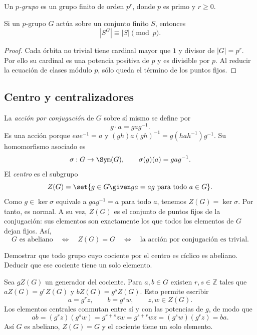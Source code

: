 \begin{defi}
Un \emph{$p$-grupo} es un grupo finito de orden $p^r$, donde $p$ es primo y $r\ge0$.
\end{defi}
\begin{coro}\label{coro:C6-fijos}
Si un $p$-grupo $G$ actúa sobre un conjunto finito $S$, entonces
\[
|S^G|\equiv|S|\pmod p.
\]
\end{coro}
\begin{proof}
Cada órbita no trivial tiene cardinal mayor que $1$ y divisor de $|G|=p^r$. Por ello su cardinal es una potencia positiva de $p$ y es divisible por $p$. Al reducir la ecuación de clases módulo $p$, sólo queda el término de los puntos fijos.
\end{proof}

\subsection{Centro y centralizadores}
La \emph{acción por conjugación} de $G$ sobre sí mismo se define por
\[
g\cdot a=gag^{-1}.
\]
Es una acción porque $eae^{-1}=a$ y $(gh)a(gh)^{-1}=g(hah^{-1})g^{-1}$. Su homomorfismo asociado es
\[
\sigma:G\to\Sym(G),\qquad \sigma(g)(a)=gag^{-1}.
\]
El \emph{centro} es el subgrupo
\[
Z(G)=\set{g\in G\given ga=ag\text{ para todo }a\in G}.
\]
Como $g\in\ker\sigma$ equivale a $gag^{-1}=a$ para todo $a$, tenemos $Z(G)=\ker\sigma$. Por tanto, es normal. A su vez, $Z(G)$ es el conjunto de puntos fijos de la conjugación: sus elementos son exactamente los que todos los elementos de $G$ dejan fijos. Así,
\[
G\text{ es abeliano}\quad\Longleftrightarrow\quad Z(G)=G
\quad\Longleftrightarrow\quad\text{la acción por conjugación es trivial}.
\]

\begin{ejer}\label{ejer:C6-centro}
Demostrar que todo grupo cuyo cociente por el centro es cíclico es abeliano. Deducir que ese cociente tiene un solo elemento.
\end{ejer}
\begin{sol}
Sea $gZ(G)$ un generador del cociente. Para $a,b\in G$ existen $r,s\in\mathbb Z$ tales que $aZ(G)=g^rZ(G)$ y $bZ(G)=g^sZ(G)$. Esto permite escribir
\[
a=g^rz,\qquad b=g^sw,\qquad z,w\in Z(G).
\]
Los elementos centrales conmutan entre sí y con las potencias de $g$, de modo que
\[
ab=(g^rz)(g^sw)=g^{r+s}zw
=g^{s+r}wz=(g^sw)(g^rz)=ba.
\]
Así $G$ es abeliano, $Z(G)=G$ y el cociente tiene un solo elemento.
\end{sol}

